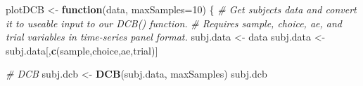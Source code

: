 \documentclass[
]{book}
\newenvironment{Shaded}{\begin{snugshade}}{\end{snugshade}}
\newcommand{\AttributeTok}[1]{\textcolor[rgb]{0.13,0.29,0.53}{#1}}
\newcommand{\CommentTok}[1]{\textcolor[rgb]{0.56,0.35,0.01}{\textit{#1}}}
\newcommand{\ControlFlowTok}[1]{\textcolor[rgb]{0.13,0.29,0.53}{\textbf{#1}}}
\newcommand{\DecValTok}[1]{\textcolor[rgb]{0.00,0.00,0.81}{#1}}
\newcommand{\FunctionTok}[1]{\textcolor[rgb]{0.13,0.29,0.53}{\textbf{#1}}}
\newcommand{\NormalTok}[1]{#1}
\newcommand{\OtherTok}[1]{\textcolor[rgb]{0.56,0.35,0.01}{#1}}
\newcommand{\StringTok}[1]{\textcolor[rgb]{0.31,0.60,0.02}{#1}}
\begin{document}
\begin{Shaded}
\begin{Highlighting}[]
\NormalTok{plotDCB }\OtherTok{\textless{}{-}} \ControlFlowTok{function}\NormalTok{(data, }\AttributeTok{maxSamples=}\DecValTok{10}\NormalTok{) \{}
  \CommentTok{\# Get subject\textquotesingle{}s data and convert it to useable input to our DCB() function.}
  \CommentTok{\# Requires sample, choice, ae, and trial variables in time{-}series panel format.}
\NormalTok{  subj.data }\OtherTok{\textless{}{-}}\NormalTok{ data}
\NormalTok{  subj.data }\OtherTok{\textless{}{-}}\NormalTok{ subj.data[,}\FunctionTok{c}\NormalTok{(}\StringTok{\textquotesingle{}sample\textquotesingle{}}\NormalTok{,}\StringTok{\textquotesingle{}choice\textquotesingle{}}\NormalTok{,}\StringTok{\textquotesingle{}ae\textquotesingle{}}\NormalTok{,}\StringTok{\textquotesingle{}trial\textquotesingle{}}\NormalTok{)]}
  
  \CommentTok{\# DCB}
\NormalTok{  subj.dcb }\OtherTok{\textless{}{-}} \FunctionTok{DCB}\NormalTok{(subj.data, maxSamples)}
\NormalTok{  subj.dcb}
  

\end{Highlighting}
\end{Shaded}
\end{document}
